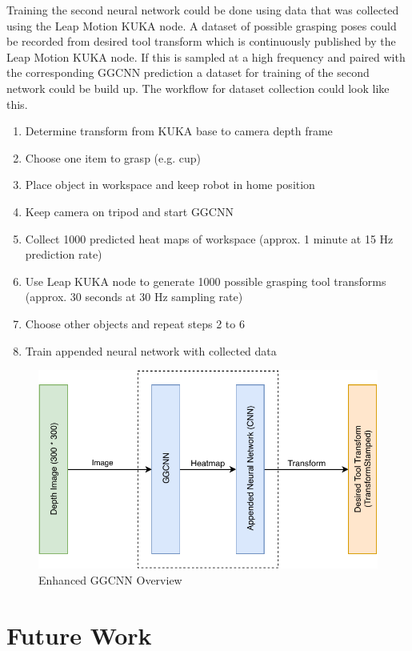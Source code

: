 \documentclass[headsepline,footinclude=false,fontsize=11pt,paper=a4,listof=totoc,bibliography=totoc,BCOR=12mm,DIV=14]{scrbook}
\begin{document}
Training the second neural network could be done using data that was collected using the Leap Motion KUKA node. A dataset of possible grasping poses could be recorded from desired tool transform which is continuously published by the Leap Motion KUKA node. If this is sampled at a high frequency and paired with the corresponding GGCNN prediction a dataset for training of the second network could be build up. The workflow for dataset collection could look like this. 

\begin{enumerate}
	\item Determine transform from KUKA base to camera depth frame
	\item Choose one item to grasp (e.g. cup)
	\item Place object in workspace and keep robot in home position
	\item Keep camera on tripod and start GGCNN
	\item Collect 1000 predicted heat maps of workspace (approx. 1 minute at 15 Hz prediction rate)
	\item Use Leap KUKA node to generate 1000 possible grasping tool transforms (approx. 30 seconds at 30 Hz sampling rate)
	\item Choose other objects and repeat steps 2 to 6
	\item Train appended neural network with collected data
\end{enumerate}

\begin{figure}[h]
    \centering
    \includegraphics[width=12cm]{images/architecture}
    \caption{Enhanced GGCNN Overview}
    \label{fig:architecture}
\end{figure}

\chapter{Future Work}\label{future}
\end{document}
